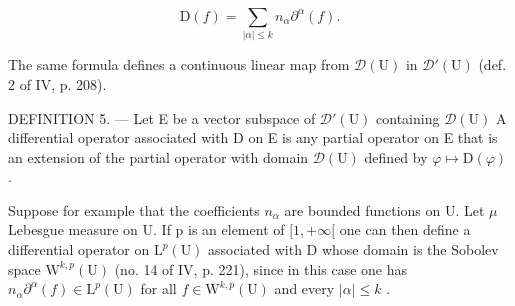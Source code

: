 \[
\mathrm{D} (f) = \sum_ {| \alpha | \leqslant k} n _ {\alpha} \partial^ {\alpha} (f).
\]

The same formula defines a continuous linear map from \(\mathcal{D}(\mathrm{U})\) in \(\mathcal{D}'(\mathrm{U})\) (def. 2 of IV, p. 208).

DEFINITION 5. --- Let E be a vector subspace of \(\mathcal{D}'(\mathrm{U})\) containing \(\mathcal{D}(\mathrm{U})\) A differential operator associated with D on E is any partial operator on E that is an extension of the partial operator with domain \(\mathcal{D}(\mathrm{U})\) defined by \(\varphi \mapsto \mathrm{D}(\varphi)\) .

Suppose for example that the coefficients \(n_{\alpha}\) are bounded functions on U. Let \(\mu\) Lebesgue measure on U. If p is an element of \([1,+\infty[\) one can then define a differential operator on \(\mathrm{L}^{p}(\mathrm{U})\) associated with D whose domain is the Sobolev space \(\mathrm{W}^{k,p}(\mathrm{U})\) (no. 14 of IV, p. 221), since in this case one has \(n_{\alpha}\partial^{\alpha}(f)\in\mathrm{L}^{p}(\mathrm{U})\) for all \(f\in\mathrm{W}^{k,p}(\mathrm{U})\) and every \(|\alpha|\leqslant k\) .

